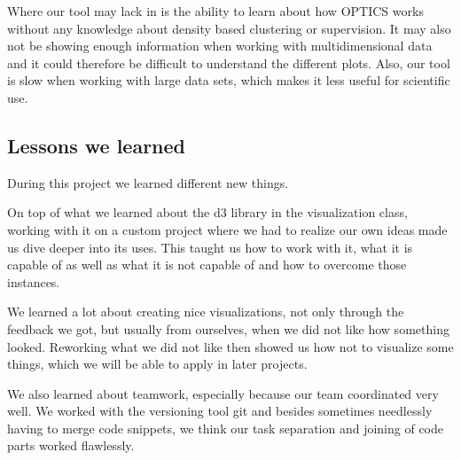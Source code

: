 \documentclass{vgtc} %
\begin{document}
Where our tool may lack in is the ability to learn about how OPTICS works without any knowledge about density based clustering or supervision. It may also not be showing enough information when working with multidimensional data and it could therefore be difficult to understand the different plots. Also, our tool is slow when working with large data sets, which makes it less useful for scientific use.

\subsection{Lessons we learned}

During this project we learned different new things.

On top of what we learned about the d3 library in the visualization class, working with it on a custom project where we had to realize our own ideas made us dive deeper into its uses. This taught us how to work with it, what it is capable of as well as what it is not capable of and how to overcome those instances.

We learned a lot about creating nice visualizations, not only through the feedback we got, but usually from ourselves, when we did not like how something looked. Reworking what we did not like then showed us how not to visualize some things, which we will be able to apply in later projects.

We also learned about teamwork, especially because our team coordinated very well. We worked with the versioning tool git and besides sometimes needlessly having to merge code snippets, we think our task separation and joining of code parts worked flawlessly.
\end{document}
